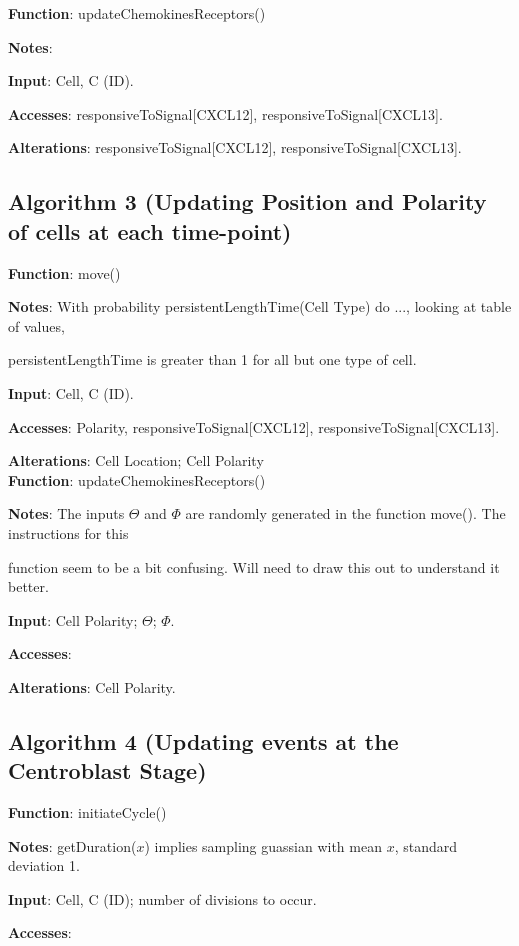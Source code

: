 \documentclass[english]{article}
\begin{document}
\textbf{Function}: updateChemokinesReceptors()

\textbf{Notes}: 
 
\textbf{Input}: Cell, C (ID).

\textbf{Accesses}: responsiveToSignal[CXCL12], responsiveToSignal[CXCL13].

\textbf{Alterations}: responsiveToSignal[CXCL12], responsiveToSignal[CXCL13].

\subsection{Algorithm 3 (Updating Position and Polarity of cells at each time-point)}

\textbf{Function}: move()
 
\textbf{Notes}: With probability persistentLengthTime(Cell Type) do ..., looking at table of values, 

persistentLengthTime is greater than 1 for all but one type of cell. 

\textbf{Input}: Cell, C (ID).	

\textbf{Accesses}: Polarity, responsiveToSignal[CXCL12], responsiveToSignal[CXCL13].

\textbf{Alterations}: Cell Location; Cell Polarity
\\
\textbf{Function}: updateChemokinesReceptors() 

\textbf{Notes}: The inputs $\Theta$ and $\Phi$ are randomly generated in the function move(). The instructions for this 

function seem to be a bit confusing. Will need to draw this out to understand it better. 


\textbf{Input}: Cell Polarity; $\Theta$; $\Phi$.  

\textbf{Accesses}: 

\textbf{Alterations}: Cell Polarity. 


\subsection{Algorithm 4 (Updating events at the Centroblast Stage)}	

\textbf{Function}: initiateCycle()

\textbf{Notes}: getDuration($x$) implies sampling guassian with mean $x$, standard deviation 1.

\textbf{Input}: Cell, C (ID); number of divisions to occur.

\textbf{Accesses}:
\end{document}
